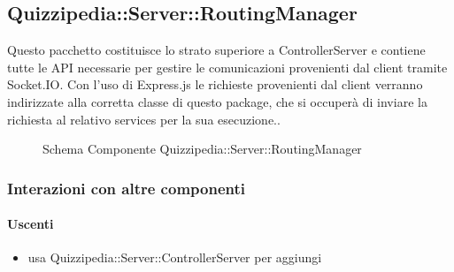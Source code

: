 \subsection{Quizzipedia::Server::RoutingManager}
Questo pacchetto costituisce lo strato superiore a ControllerServer e contiene tutte le API necessarie per gestire le comunicazioni provenienti dal client tramite Socket.IO. 
Con l'uso di Express.js le richieste provenienti dal client verranno indirizzate alla corretta classe di questo package, che si occuperà di inviare la richiesta al relativo services per la sua esecuzione..
\begin{figure}[H]
\centering
\noindent{}
\caption[Schema Componente Quizzipedia::Server::RoutingManager]{Schema Componente Quizzipedia::Server::RoutingManager}
\end{figure}
\subsubsection{Interazioni con altre componenti}
\paragraph{Uscenti}
\begin{itemize}
\item usa Quizzipedia::Server::ControllerServer per aggiungi
\end{itemize}

